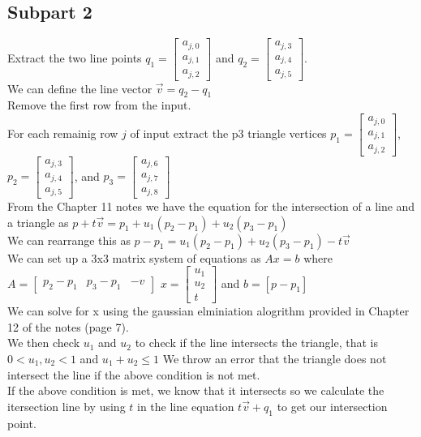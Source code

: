 \documentclass[11pt]{article}
\begin{document}
\subsection*{Subpart 2}
	Extract the two line points $q_1 = \begin{bmatrix} a_{j,0} \\a_{j,1} \\a_{j,2}\end{bmatrix}$ and $q_2 = \begin{bmatrix} a_{j,3} \\a_{j,4} \\a_{j,5}\end{bmatrix}$.\\
	We can define the line vector $\vec{v} = q_2-q_1$\\
	Remove the first row from the input.\\
	For each remainig row $j$ of input extract the p3 triangle vertices $p_1 = \begin{bmatrix} a_{j,0} \\a_{j,1} \\a_{j,2}\end{bmatrix}$,
	 $p_2 = \begin{bmatrix} a_{j,3} \\a_{j,4} \\a_{j,5}\end{bmatrix}$,  and
	 $p_3 = \begin{bmatrix} a_{j,6} \\a_{j,7} \\a_{j,8}\end{bmatrix}$\\
	 From the Chapter 11 notes we have the equation for the intersection of a line and a triangle as $p+t\vec{v} = p_1 + u_1(p_2-p_1) + u_2(p_3-p_1)$\\
	 We can rearrange this as $p-p_1 = u_1(p_2-p_1) + u_2(p_3-p_1) - t\vec{v}$\\
	 We can set up a 3x3 matrix system of equations as $Ax=b$ where $A = \begin{bmatrix}p_2-p_1 & p_3-p_1 & -v\end{bmatrix}$ $x = \begin{bmatrix} u_1\\u_2\\t\end{bmatrix}$  and $b = [p-p_1]$\\
	 We can solve for x using the gaussian elminiation alogrithm provided in Chapter 12 of the notes (page 7).\\
	 We then check $u_1$ and $u_2$ to check if the line intersects the triangle, that is $0 < u_1,u_2 <1$ and $ u_1 + u_2 \leq 1$
	 We throw an error that the triangle does not intersect the line if the above condition is not met.\\
	 If the above condition is met, we know that it intersects so we calculate the itersection line by using $t$ in the line equation $t\vec{v} + q_1$ to get our intersection point.
\end{document}

